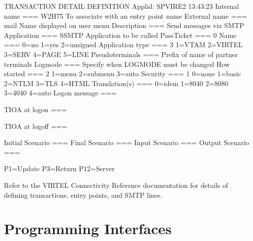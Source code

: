 \documentclass[letterpaper,10pt,english]{sphinxmanual}
\begin{document}
\begin{sphinxVerbatim}[commandchars=\\\{\}]
TRANSACTION DETAIL DEFINITION \PYGZhy{}\PYGZhy{}\PYGZhy{}\PYGZhy{}\PYGZhy{}\PYGZhy{}\PYGZhy{}\PYGZhy{}\PYGZhy{}\PYGZhy{}\PYGZhy{}\PYGZhy{}\PYGZhy{}\PYGZhy{}\PYGZhy{}\PYGZhy{}\PYGZhy{}\PYGZhy{}\PYGZhy{}\PYGZhy{}\PYGZhy{}\PYGZhy{} Applid: SPVIRE2 13:43:23
Internal name ===\PYGZgt{} W2H\PYGZhy{}75                To associate with an entry point name
External name ===\PYGZgt{} \PYGZdl{}mail\PYGZdl{}                Name displayed on user menu
Description   ===\PYGZgt{} Send messages via SMTP
Application   ===\PYGZgt{} S\PYGZhy{}SMTP                Application to be called
PassTicket    ===\PYGZgt{} 0 Name ===\PYGZgt{}           0=no 1=yes 2=unsigned
Application type ===\PYGZgt{} 3                  1=VTAM 2=VIRTEL 3=SERV 4=PAGE 5=LINE
Pseudo\PYGZhy{}terminals ===\PYGZgt{}                    Prefix of name of partner terminals
Logmode          ===\PYGZgt{}                    Specify when LOGMODE must be changed
How started      ===\PYGZgt{} 2                  1=menu 2=sub\PYGZhy{}menu 3=auto
Security         ===\PYGZgt{} 1                  0=none 1=basic 2=NTLM 3=TLS 4=HTML
Translation(s)   ===\PYGZgt{}                    0=idem 1=8040 2=8080 3=4040 4=auto
Logon message    ===\PYGZgt{}

TIOA at logon    ===\PYGZgt{}

TIOA at logoff   ===\PYGZgt{}

Initial Scenario ===\PYGZgt{}                   Final Scenario    ===\PYGZgt{}
Input Scenario   ===\PYGZgt{}                   Output Scenario   ===\PYGZgt{}

P1=Update                        P3=Return                     P12=Server
\end{sphinxVerbatim}


Refer to the VIRTEL Connectivity Reference documentation for details of defining transactions, entry points, and SMTP lines.


\chapter{Programming Interfaces}
\label{\detokenize{User_Guide:v457ug-programming-interfaces}}\label{\detokenize{User_Guide:programming-interfaces}}
\end{document}
